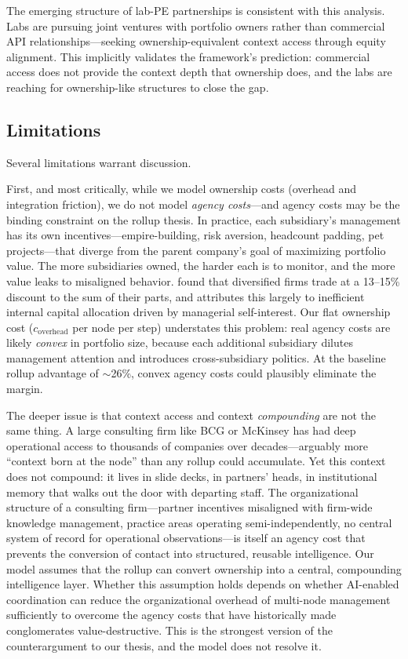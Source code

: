 \documentclass[12pt]{article}
\theoremstyle{definition}
\begin{document}
The emerging structure of lab-PE partnerships is consistent with this analysis. Labs are pursuing joint ventures with portfolio owners rather than commercial API relationships---seeking ownership-equivalent context access through equity alignment. This implicitly validates the framework's prediction: commercial access does not provide the context depth that ownership does, and the labs are reaching for ownership-like structures to close the gap.

\subsection{Limitations}

Several limitations warrant discussion.

First, and most critically, while we model ownership costs (overhead and integration friction), we do not model \textit{agency costs}---and agency costs may be the binding constraint on the rollup thesis. In practice, each subsidiary's management has its own incentives---empire-building, risk aversion, headcount padding, pet projects---that diverge from the parent company's goal of maximizing portfolio value. The more subsidiaries owned, the harder each is to monitor, and the more value leaks to misaligned behavior. \citet{berger1995} found that diversified firms trade at a 13--15\% discount to the sum of their parts, and \citet{jensen1986} attributes this largely to inefficient internal capital allocation driven by managerial self-interest. Our flat ownership cost ($c_{\text{overhead}}$ per node per step) understates this problem: real agency costs are likely \textit{convex} in portfolio size, because each additional subsidiary dilutes management attention and introduces cross-subsidiary politics. At the baseline rollup advantage of $\sim$26\%, convex agency costs could plausibly eliminate the margin.

The deeper issue is that context access and context \textit{compounding} are not the same thing. A large consulting firm like BCG or McKinsey has had deep operational access to thousands of companies over decades---arguably more ``context born at the node'' than any rollup could accumulate. Yet this context does not compound: it lives in slide decks, in partners' heads, in institutional memory that walks out the door with departing staff. The organizational structure of a consulting firm---partner incentives misaligned with firm-wide knowledge management, practice areas operating semi-independently, no central system of record for operational observations---is itself an agency cost that prevents the conversion of contact into structured, reusable intelligence. Our model assumes that the rollup can convert ownership into a central, compounding intelligence layer. Whether this assumption holds depends on whether AI-enabled coordination can reduce the organizational overhead of multi-node management sufficiently to overcome the agency costs that have historically made conglomerates value-destructive. This is the strongest version of the counterargument to our thesis, and the model does not resolve it.
\end{document}
